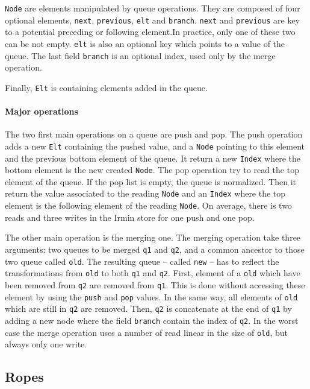 \documentclass{article}
\renewcommand{\-}{\hyp}
\newcommand{\irmin}{Irmin\xspace}
\newcommand{\code}[1]{\texttt{#1}}
\begin{document}
\code{Node} are elements manipulated by queue operations.
They are composed of four optional elements, \code{next}, \code{previous}, \code{elt} and \code{branch}. \code{next} and \code{previous} are key to a potential preceding or following element.In practice, only one of these two can be not empty. \code{elt} is also an optional key which points to a value of the queue. The last field \code{branch} is an optional index, used only by the merge operation.

Finally, \code{Elt} is containing elements added in the queue.


\paragraph{Major operations}
The two first main operations on a queue are push and pop.
The push operation adds a new \code{Elt} containing the pushed value, and a \code{Node} pointing to this element and the previous bottom element of the queue.
It return a new \code{Index} where the bottom element is the new created \code{Node}.
The pop operation try to read the top element of the queue.
If the pop list is empty, the queue is normalized.
Then it return the value associated to the reading \code{Node} and an \code{Index} where the top element is the following element of the reading \code{Node}.
On average, there is two reads and three writes in the \irmin store for one push and one pop.

The other main operation is the merging one.
The merging operation take three arguments: two queues to be merged \code{q1} and \code{q2}, and a common ancestor to those two queue called \code{old}.
The resulting queue -- called \code{new} -- has to reflect the transformations from \code{old} to both \code{q1} and \code{q2}. First, element of a \code{old} which have been removed from \code{q2} are removed from \code{q1}. This is done without accessing these element by using the \code{push} and \code{pop} values. In the same way, all elements of \code{old} which are still in \code{q2} are removed. Then, \code{q2} is concatenate at the end of \code{q1} by adding a new node where the field \code{branch} contain the index of \code{q2}. In the worst case the merge operation uses a number of read linear in the size of \code{old}, but always only one write.


\subsection{Ropes}
\end{document}
